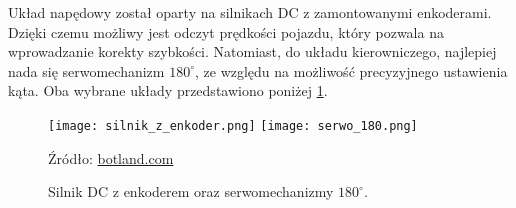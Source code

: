             Układ napędowy został oparty na silnikach DC z zamontowanymi enkoderami.
            Dzięki czemu możliwy jest odczyt prędkości pojazdu, który pozwala na wprowadzanie korekty szybkości.
            Natomiast, do układu kierowniczego, najlepiej nada się serwomechanizm $180^\circ$, ze względu na możliwość precyzyjnego ustawienia kąta. Oba wybrane układy przedstawiono poniżej \ref{fig:engines}.
            \begin{figure}[!ht]
                \centering
                \texttt{[image: silnik\_z\_enkoder.png]}
                \texttt{[image: serwo\_180.png]}

                \caption{Silnik DC z enkoderem oraz serwomechanizmy $180^\circ$.}
                \footnotesize{Źródło: \href{https://botland.com.pl/}{botland.com}}
                \label{fig:engines}
            \end{figure}


